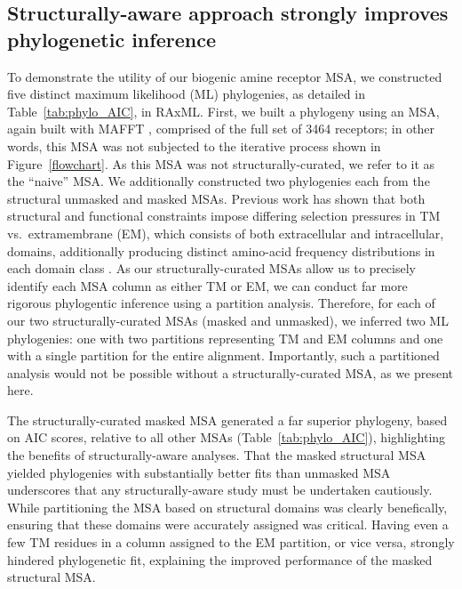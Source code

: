 \documentclass[fleqn,10pt]{wlpeerj}
\begin{document}
\subsection*{Structurally-aware approach strongly improves phylogenetic inference}

To demonstrate the utility of our biogenic amine receptor MSA, we constructed five distinct maximum likelihood (ML) phylogenies, as detailed in Table~\ref{tab:phylo_AIC}, in RAxML. First, we built a phylogeny using an MSA, again built with MAFFT \citep{mafftv7}, comprised of the full set of 3464 receptors; in other words, this MSA was not subjected to the iterative process shown in Figure~\ref{flowchart}. As this MSA was not structurally-curated, we refer to it as the ``naive'' MSA. We additionally constructed two phylogenies each from the structural unmasked and masked MSAs. Previous work has shown that both structural and functional constraints impose differing selection pressures in TM vs.\ extramembrane (EM), which consists of both extracellular and intracellular, domains, additionally producing distinct amino-acid frequency distributions in each domain class \cite{Tourasse2000,Stevens2001,Julenius2006,Oberai2009,SpielmanWilke2013,FranzosaXueXia2013}. As our structurally-curated MSAs allow us to precisely identify each MSA column as either TM or EM, we can conduct far more rigorous phylogentic inference using a partition analysis. Therefore, for each of our two structurally-curated MSAs (masked and unmasked), we inferred two ML phylogenies: one with two partitions representing TM and EM columns and one with a single partition for the entire alignment. Importantly, such a partitioned analysis would not be possible without a structurally-curated MSA, as we present here.

The structurally-curated masked MSA generated a far superior phylogeny, based on AIC scores, relative to all other MSAs (Table~\ref{tab:phylo_AIC}), highlighting the benefits of structurally-aware analyses. That the masked structural MSA yielded phylogenies with substantially better fits than unmasked MSA underscores that any structurally-aware study must be undertaken cautiously. While partitioning the MSA based on structural domains was clearly benefically, ensuring that these domains were accurately assigned was critical. Having even a few TM residues in a column assigned to the EM partition, or vice versa, strongly hindered phylogenetic fit, explaining the improved performance of the masked structural MSA.
\end{document}
